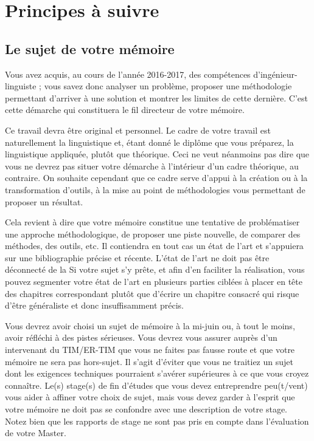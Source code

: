 \chapter{Principes à suivre}

\section{Le sujet de votre mémoire}
Vous avez acquis, au cours de l'année 2016-2017, des compétences d'ingénieur-linguiste ; vous savez donc analyser un problème, proposer une méthodologie permettant d'arriver à une solution et montrer les limites de cette dernière. C'est cette démarche qui constituera le fil directeur de votre mémoire.

Ce travail devra être original et personnel. Le cadre de votre travail est naturellement la linguistique et, étant donné le diplôme que vous préparez, la linguistique appliquée, plutôt que théorique. Ceci ne veut néanmoins pas dire que vous ne devrez pas situer votre démarche à l'intérieur d'un cadre théorique, au contraire. On souhaite cependant que ce cadre serve d'appui à la création ou à la transformation d'outils, à la mise au point de méthodologies vous permettant de proposer un résultat.

Cela revient à dire que votre mémoire constitue une tentative de problématiser une approche méthodologique, de proposer une piste nouvelle, de comparer des méthodes, des outils, etc. Il contiendra en tout cas un état de l'art et s'appuiera sur une bibliographie précise et récente. L'état de l'art ne doit pas être déconnecté de la %
Si votre sujet s'y prête, et afin d'en faciliter la réalisation, vous pouvez segmenter votre état de l'art en plusieurs parties ciblées à placer en tête des chapitres correspondant plutôt que d'écrire un chapitre consacré qui risque d'être généraliste et donc insuffisamment précis.

Vous devrez avoir choisi un sujet de mémoire à la mi-juin ou, à tout le moins, avoir réfléchi à des pistes sérieuses. Vous devrez vous assurer auprès d'un intervenant du TIM/ER-TIM que vous ne faites pas fausse route et que votre mémoire ne sera pas hors-sujet. Il s'agit d'éviter que vous ne traitiez un sujet dont les exigences techniques pourraient s'avérer supérieures à ce que vous croyez connaître. Le(s) stage(s) de fin d'études que vous devez entreprendre peu(t/vent) vous aider à affiner votre choix de sujet, mais vous devez garder à l'esprit que votre mémoire ne doit pas se confondre avec une description de votre stage. Notez bien que les rapports de stage ne sont pas pris en compte dans l'évaluation de votre Master.

